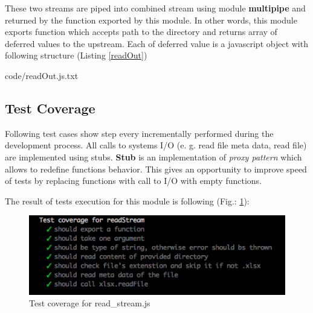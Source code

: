 These two streams are piped into combined stream using module \textbf{multipipe} and returned by the function exported by this module.
In other words, this module exports function which accepts path to the directory and returns array of deferred values to the upstream. Each of deferred value  is a javascript object with following structure (Listing \ref{readOut})

{code/readOut.js.txt}

\subsection{Test Coverage}
Following test cases show step every incrementally performed during the development process. All calls to systems I/O (e. g. read file meta data, read file) are implemented using stubs. \textbf{Stub} is an implementation of \textit{proxy pattern} which allows to redefine functions behavior. This gives an opportunity to improve speed of tests by replacing functions with call to I/O with empty functions.
%

The result of tests execution  for this module is following (Fig.: \ref{fig:testRead}):
\begin{figure}[H]
	\centering
	\includegraphics[width=\linewidth]{grafiken/testReadStream.png}
	\caption{Test coverage for read\_stream.js}
	\label{fig:testRead}
\end{figure}



